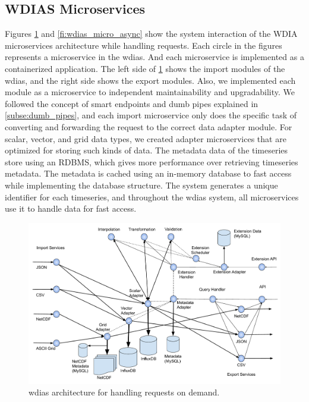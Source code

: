 \subsection{WDIAS Microservices}
\label{sebse:wdias_microservices}

Figures \ref{fi:wdias_micro_on_demand} and \ref{fi:wdias_micro_async} show the system interaction of the WDIA microservices architecture while handling requests. Each circle in the figures represents a microservice in the \acrshort{wdias}. And each microservice is implemented as a containerized application. The left side of \cref{fi:wdias_micro_on_demand} shows the import modules of the \acrshort{wdias}, and the right side shows the export modules. Also, we implemented each module as a microservice to independent maintainability and upgradability. We followed the concept of smart endpoints and dumb pipes explained in \cref{subse:dumb_pipes}, and each import microservice only does the specific task of converting and forwarding the request to the correct data adapter module. For scalar, vector, and grid data types, we created adapter microservices that are optimized for storing such kinds of data. The metadata data of the timeseries store using an RDBMS, which gives more performance over retrieving timeseries metadata. The metadata is cached using an in-memory database to fast access while implementing the database structure. The system generates a unique identifier for each timeseries, and throughout the \acrshort{wdias} system, all microservices use it to handle data for fast access.

\begin{figure}[htp]
    \centering
    \includegraphics[width=1\textwidth]{method/microservice/microservice_architecture-handle_on_demand-v4.pdf}
    \caption{\acrshort{wdias} architecture for handling requests on demand.}
    \label{fi:wdias_micro_on_demand}
\end{figure}

